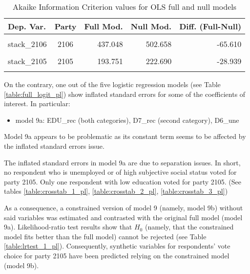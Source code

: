 \documentclass[
]{article}
\providecommand{\tightlist}{%
  \setlength{\itemsep}{0pt}\setlength{\parskip}{0pt}}
\begin{document}
\begin{table}[!h]

\caption{\label{tab:unnamed-chunk-137}Akaike Information Criterion values for OLS full and null models 
        \label{table:ols_aic_pl}}
\centering
\begin{tabular}[t]{lcrrr}
\toprule
Dep. Var. & Party & Full Mod. & Null Mod. & Diff. (Full-Null)\\
\midrule
\cellcolor{gray!6}{stack\_2104} & \cellcolor{gray!6}{2104} & \cellcolor{gray!6}{833.338} & \cellcolor{gray!6}{943.422} & \cellcolor{gray!6}{-110.085}\\
stack\_2106 & 2106 & 437.048 & 502.658 & -65.610\\
\cellcolor{gray!6}{stack\_2102} & \cellcolor{gray!6}{2102} & \cellcolor{gray!6}{469.635} & \cellcolor{gray!6}{555.309} & \cellcolor{gray!6}{-85.674}\\
stack\_2105 & 2105 & 193.751 & 222.690 & -28.939\\
\cellcolor{gray!6}{stack\_2103} & \cellcolor{gray!6}{2103} & \cellcolor{gray!6}{112.730} & \cellcolor{gray!6}{127.620} & \cellcolor{gray!6}{-14.890}\\
\bottomrule
\end{tabular}
\end{table}

On the contrary, one out of the five logistic regression models (see Table \ref{table:full_logit_pl}) show
inflated standard errors for some of the coefficients of interest. In particular:

\begin{itemize}
\tightlist
\item
  model 9a: EDU\_rec (both categories), D7\_rec (second category), D6\_une
\end{itemize}

Model 9a appears to be problematic as its constant term seems to be affected by the inflated standard errors issue.

The inflated standard errors in model 9a are due to separation issues. In short, no respondent who is unemployed or of high subjective social status voted for party 2105. Only one respondent with low education voted for party 2105. (See tables \ref{table:crosstab_1_pl}, \ref{table:crosstab_2_pl}, \ref{table:crosstab_3_pl})

As a consequence, a constrained version of model 9 (namely, model 9b) without said variables was
estimated and contrasted with the original full model (model 9a). Likelihood-ratio test results show
that \(H_0\) (namely, that the constrained model fits better than the full model) cannot be rejected
(see Table \ref{table:lrtest_1_pl}). Consequently, synthetic variables for respondents' vote choice for
party 2105 have been predicted relying on the constrained model (model 9b).
\end{document}
